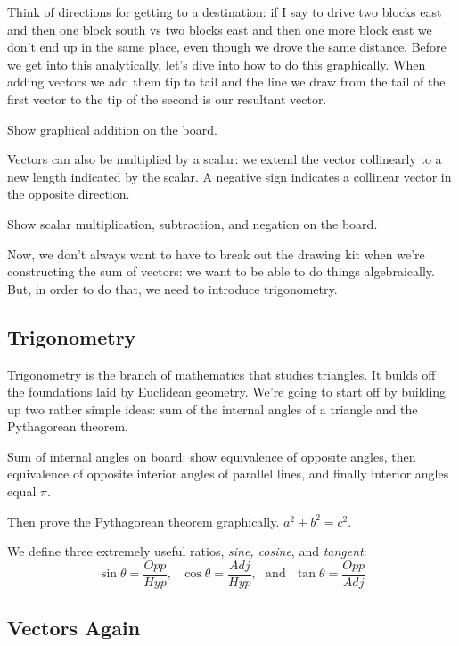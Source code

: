 \documentclass[letterpaper,12pt]{article}
\begin{document}
Think of directions for getting to a destination: if I say to drive two blocks east and then one block south vs two blocks east and then one more block east we don't end up in the same place, even though we drove the same distance. Before we get into this analytically, let's dive into how to do this graphically. When adding vectors we add them tip to tail and the line we draw from the tail of the first vector to the tip of the second is our resultant vector.

Show graphical addition on the board.

Vectors can also be multiplied by a scalar: we extend the vector collinearly to a new length indicated by the scalar. A negative sign indicates a collinear vector in the opposite direction.

Show scalar multiplication, subtraction, and negation on the board.

Now, we don't always want to have to break out the drawing kit when we're constructing the sum of vectors: we want to be able to do things algebraically. But, in order to do that, we need to introduce trigonometry.

\subsection{Trigonometry}\label{sec:trig}

Trigonometry is the branch of mathematics that studies triangles. It builds off the foundations laid by Euclidean geometry. We're going to start off by building up two rather simple ideas: sum of the internal angles of a triangle and the Pythagorean theorem. 

Sum of internal angles on board: show equivalence of opposite angles, then equivalence of opposite interior angles of parallel lines, and finally interior angles equal $\pi$.

Then prove the Pythagorean theorem graphically. $a^2 + b^2 = c^2$.

We define three extremely useful ratios, \textit{sine, cosine}, and \textit{tangent}:
\begin{equation}\label{eqn:trigDefs}
\sin \theta = \frac{Opp}{Hyp}, \,\,\,\, \cos \theta =\frac{Adj}{Hyp}, \,\,\,\, \mathrm{and} \,\,\,\, \tan \theta = \frac{Opp}{Adj}
\end{equation}

\subsection{Vectors Again}\label{sec:vectors2}
\end{document}
